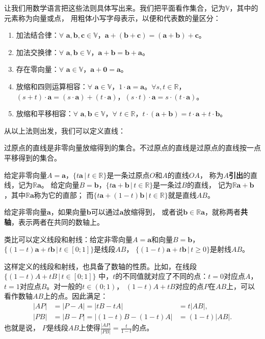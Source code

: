 \documentclass[12pt,UTF8]{ctexbook}
\begin{document}
让我们用数学语言把这些法则具体写出来。我们把平面看作集合，记为$\mathbb{V}$，其中的元素称为向量或点，
用粗体小写字母表示，以便和代表数的量区分：
\begin{enumerate}
    \item 加法结合律：$\forall \,\, \mathbf{a}, \mathbf{b}, \mathbf{c} \in \mathbb{V}$，$\mathbf{a}+ (\mathbf{b} + \mathbf{c}) = (\mathbf{a} + \mathbf{b}) + \mathbf{c}$。
    \item 加法交换律：$\forall \,\, \mathbf{a}, \mathbf{b} \in \mathbb{V}$，$\mathbf{a} + \mathbf{b} = \mathbf{b} + \mathbf{a}$。
    \item 存在零向量：$\forall \,\, \mathbf{a} \in \mathbb{V}$，$\mathbf{a} + \mathbf{0} = \mathbf{a}$。
    \item 放缩和四则运算相容：$\forall \,\, \mathbf{a} \in \mathbb{V}$，$1\cdot \mathbf{a} = \mathbf{a}$。$\forall s, t \in \mathbb{R}$，$(s + t)\cdot\mathbf{a} = (s\cdot\mathbf{a}) + (t\cdot\mathbf{a})$，$(s \cdot t)\cdot \mathbf{a} = s \cdot (t\cdot \mathbf{a})$。
    \item 放缩和平移相容：$\forall \,\, \mathbf{a}, \mathbf{b} \in \mathbb{V}$，$\forall \,\, t \in \mathbb{R}$，$t\cdot(\mathbf{a} + \mathbf{b}) = t\cdot\mathbf{a} + t\cdot\mathbf{b}$。
\end{enumerate}

从以上法则出发，我们可以定义直线：
\begin{df}
    过原点的直线是非零向量放缩得到的集合。不过原点的直线是过原点的直线按一点平移得到的集合。
\end{df}
给定非零向量$A = \mathbf{a}$，$ \{t\mathbf{a} \, | \, t\in\mathbb{R}\}$是一条过原点$O$和$A$的直线$OA$，
称为$A$\textbf{引出}的直线，记为$\mathbb{R}\mathbf{a}$。
给定向量$B = \mathbf{b}$，$ \{t\mathbf{a}+\mathbf{b} \, | \, t\in\mathbb{R}\}$是一条过$B$的直线，
记为$\mathbb{R}\mathbf{a}+\mathbf{b}$，其中$\mathbb{R}\mathbf{a}$称为它的直部；
而$ \{t\mathbf{a}+(1 - t)\mathbf{b} \, | \, t\in\mathbb{R}\}$就是直线$AB$。

给定非零向量$\mathbf{a}$，如果向量$\mathbf{b}$可以通过$\mathbf{a}$放缩得到，
或者说$\mathbf{b}\in \mathbb{R}\mathbf{a}$，就称两者\textbf{共轴}，表示两者在共同的数轴上。

类比可以定义线段和射线：给定非零向量$A = \mathbf{a}$和向量$B =\mathbf{b}$，
$ \{(1 - t)\mathbf{a}+t\mathbf{b} \, | \, t\in [0; 1]\}$是线段$AB$，
$ \{(1 - t)\mathbf{a}+t\mathbf{b} \, | \, t \geqslant 0 \}$是射线$AB$。

这样定义的线段和射线，也具备了数轴的性质。比如，在线段$\{(1 - t)A+tB \, | \, t\in [0; 1]\}$
中，$t$的不同值就对应了不同的点：$t = 0$对应点$A$，$t=1$对应点$B$。对一般的$t\in (0;1)$，
$(1 - t)A+tB$对应的点$P$在$AB$上，可以看作数轴$AB$上的点。因此满足：
$$
\begin{array}{lll}
    |AP| &= |P - A| = |tB - tA| &= t|AB|, \\
    |PB| &= |B - P| = |(1 - t)B - (1 - t)A| &= (1 - t)|AB|.
\end{array}
$$
也就是说，
$P$是线段$AB$上使得$ \frac{|AP|}{|PB|} = \frac{t}{1 - t}$的点。
\end{document}
